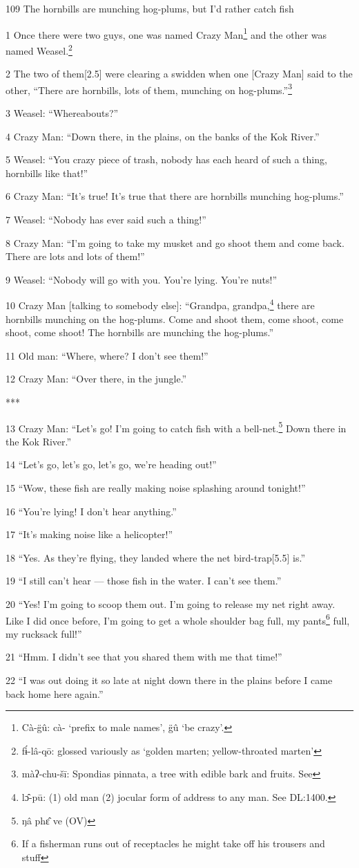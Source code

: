 
109 The hornbills are munching hog-plums, but I'd rather catch fish

1 Once there were two guys, one was named Crazy Man\footnote{Cà-g̈û: cà- `prefix to male names', g̈û `be crazy'.} and the other was named
Weasel.\footnote{fɨ́-lâ-qō: glossed variously as `golden marten; yellow-throated marten'}

2 The two of them[2.5] were clearing a swidden when one [Crazy Man] said to the
other, ``There are hornbills, lots of them, munching on hog-plums.''\footnote{màʔ-chu-šī: Spondias pinnata, a tree with edible bark and fruits. See}

3 Weasel: ``Whereabouts?''

4 Crazy Man: ``Down there, in the plains, on the banks of the Kok River.''

5 Weasel: ``You crazy piece of trash, nobody has each heard of such a thing, hornbills
like that!''

6 Crazy Man: ``It's true! It's true that there are hornbills munching hog-plums.''

7 Weasel: ``Nobody has ever said such a thing!''

8 Crazy Man: ``I'm going to take my musket and go shoot them and come back. There
are lots and lots of them!''

9 Weasel: ``Nobody will go with you. You're lying. You're nuts!''

10 Crazy Man [talking to somebody else]: ``Grandpa, grandpa,\footnote{lɔ̂-pū: (1) old man (2) jocular form of address to any man. See DL:1400.} there are hornbills
munching on the hog-plums. Come and shoot them, come shoot, come shoot, come shoot!
The hornbills are munching the hog-plums.''

11 Old man: ``Where, where? I don't see them!''

12 Crazy Man: ``Over there, in the jungle.''

***

13 Crazy Man: ``Let's go! I'm going to catch fish with a bell-net.\footnote{ŋâ phɛ̂ ve (OV)} Down there
in the Kok River.''

14 ``Let's go, let's go, let's go, we're heading out!''

15 ``Wow, these fish are really making noise splashing around tonight!''

16 ``You're lying! I don't hear anything.''

17 ``It's making noise like a helicopter!''

18 ``Yes. As they're flying, they landed where the net bird-trap[5.5] is.''

19 ``I still can't hear --- those fish in the water. I can't see them.''

20 ``Yes! I'm going to scoop them out. I'm going to release my net right away.
Like I did once before, I'm going to get a whole shoulder bag full, my pants\footnote{If a fisherman runs out of receptacles he might take off his trousers and stuff}
full, my rucksack full!''

21 ``Hmm. I didn't see that you shared them with me that time!''

22 ``I was out doing it so late at night down there in the plains before I came
back home here again.''

